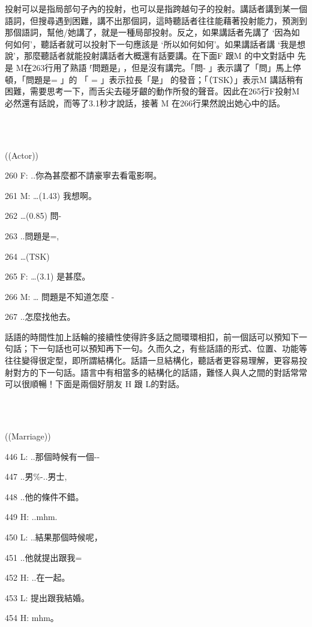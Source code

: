 投射可以是指局部句子內的投射，也可以是指跨越句子的投射。講話者講到某一個語詞，但搜尋遇到困難，講不出那個詞，這時聽話者往往能藉著投射能力，預測到那個語詞，幫他/她講了，就是一種局部投射。反之，如果講話者先講了 ‘因為如何如何’，聽話者就可以投射下一句應該是 ‘所以如何如何’。如果講話者講 ‘我是想說’，那麼聽話者就能投射講話者大概還有話要講。在下面F 跟M 的中文對話中 先是 M在263行用了熟語  ⸢問題是⸥ ，但是沒有講完。「問- 」表示講了「問」馬上停頓，「問題是= 」的 「 = 」表示拉長「是」 的發音；「（TSK）」表示M 講話稍有困難，需要思考一下，而舌尖去碰牙齦的動作所發的聲音。因此在265行F投射M必然還有話說，而等了3.1秒才說話，接著 M 在266行果然說出她心中的話。

\ea%
\label{ex:key:2}
\gll\\
\\
\glt
\z

((Actor))

260  F:  ..你為甚麼都不請豪寧去看電影啊。

261  M:  …(1.43) 我想啊。           

262        …(0.85) 問-

263        ..問題是=,      

264        …(TSK)

265  F:  …(3.1) 是甚麼。

266  M:  … 問題是不知道怎麼 -

267         ..怎麼找他去。

話語的時間性加上話輪的接續性使得許多話之間環環相扣，前一個話可以預知下一句話；下一句話也可以預知再下一句。久而久之，有些話語的形式、位置、功能等往往變得很定型，即所謂結構化。話語一旦結構化，聽話者更容易理解，更容易投射對方的下一句話。語言中有相當多的結構化的話語，難怪人與人之間的對話常常可以很順暢！下面是兩個好朋友 H 跟 L的對話。

\ea%
\label{ex:key:3}
\gll\\
\\
\glt
\z

((Marriage))

446  L:  ..那個時候有一個-{}-

447      ..男\%-..男士,

448      ..他的條件不錯。

449  H:  ..mhm.

450  L:  ..結果那個時候呢，

451     ..他就提出跟我=

452  H:  ..在一起。

453  L:  提出跟我結婚。

454  H:  mhm。

